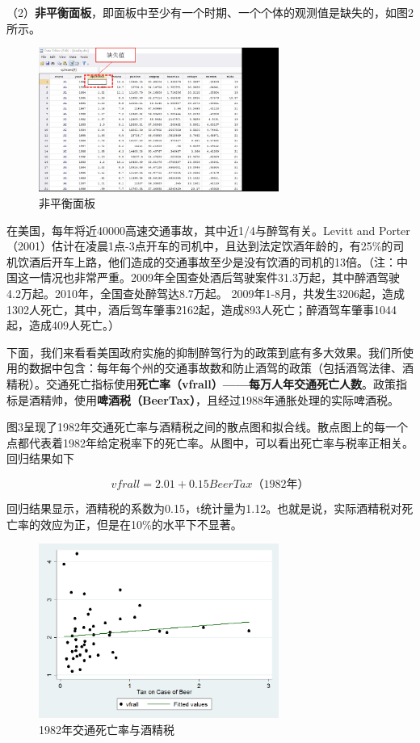 \documentclass[cn,12pt,math=newtx,citestyle=gb7714-2015,bibstyle=gb7714-2015]{elegantbook}
\begin{document}
（2）\textbf{非平衡面板}，即面板中至少有一个时期、一个个体的观测值是缺失的，如图2所示。
\begin{figure}[htbp]
	\centering
	\includegraphics[width=0.7\textwidth]{unbalancedpanel.jpg}
	\caption{非平衡面板}\label{fig:digit}
\end{figure}

在美国，每年将近40000高速交通事故，其中近1/4与醉驾有关。Levitt and Porter（2001）估计在凌晨1点-3点开车的司机中，且达到法定饮酒年龄的，有25\%的司机饮酒后开车上路，他们造成的交通事故至少是没有饮酒的司机的13倍。（注：中国这一情况也非常严重。2009年全国查处酒后驾驶案件31.3万起，其中醉酒驾驶4.2万起。2010年，全国查处醉驾达8.7万起。 2009年1-8月，共发生3206起，造成1302人死亡，其中，酒后驾车肇事2162起，造成893人死亡；醉酒驾车肇事1044起，造成409人死亡。）

下面，我们来看看美国政府实施的抑制醉驾行为的政策到底有多大效果。我们所使用的数据中包含：每年每个州的交通事故数和防止酒驾的政策（包括酒驾法律、酒精税）。交通死亡指标使用\textbf{死亡率（vfrall）——每万人年交通死亡人数}。政策指标是酒精帅，使用\textbf{啤酒税（BeerTax）}，且经过1988年通胀处理的实际啤酒税。

图3呈现了1982年交通死亡率与酒精税之间的散点图和拟合线。散点图上的每一个点都代表着1982年给定税率下的死亡率。从图中，可以看出死亡率与税率正相关。回归结果如下

\begin{equation}
	vfrall=2.01+0.15BeerTax（1982年）
\end{equation}

回归结果显示，酒精税的系数为0.15，t统计量为1.12。也就是说，实际酒精税对死亡率的效应为正，但是在10\%的水平下不显著。

\begin{figure}[htbp]
	\centering
	\includegraphics[width=0.7\textwidth]{1982.png}
	\caption{1982年交通死亡率与酒精税}\label{fig:digit}
\end{figure}
\end{document}

